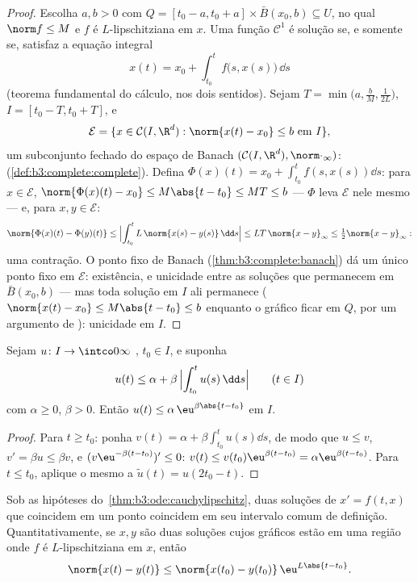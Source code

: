 \begin{proof}
Escolha $a, b > 0$ com $Q = [t_0 - a, t_0 + a]\times\bar
B(x_0, b) \subseteq U$, no qual $\norm f \leq M$ e $f$ é $L$-lipschitziana em
$x$. Uma função $\mathcal C^1$ é solução se, e somente se, satisfaz a equação
integral
\[
x(t) = x_0 + \int_{t_0}^{t}f\bigl(s, x(s)\bigr)\,\dd s
\]
(teorema fundamental do cálculo, nos dois sentidos). Sejam $T =
\min\bigl(a, \frac bM, \frac1{2L}\bigr)$, $I = [t_0 - T, t_0
+ T]$, e
\[
\mathcal E = \{x \in \mathcal C(I, \R^d) : \norm{x(t) - x_0}
\leq b\ \text{em } I\},
\]
um subconjunto fechado do espaço de Banach $(\mathcal C(I, \R^d),
\norm\cdot_\infty)$: 
(\cref{def:b3:complete:complete}). Defina $\Phi(x)(t) = x_0 +
\int_{t_0}^tf(s, x(s))\dd s$: para $x \in \mathcal E$, $\norm{\Phi(x)(t) - x_0} \leq M\abs{t - t_0} \leq MT \leq b$ --- $\Phi$ leva $\mathcal E$
nele mesmo --- e, para $x, y \in
\mathcal E$:
\[
\norm{\Phi(x)(t) - \Phi(y)(t)} \leq \Bigl|\int_{t_0}^t
L\,\norm{x(s) - y(s)}\,\dd s\Bigr| \leq LT\,\norm{x -
y}_\infty \leq \tfrac12\norm{x - y}_\infty :
\]
uma contração. O ponto fixo de Banach (\cref{thm:b3:complete:banach}) dá um único ponto
fixo em $\mathcal E$: existência, e unicidade entre as soluções que permanecem
em $\bar B(x_0, b)$ --- mas toda solução em $I$ ali permanece ($\norm{x(t) - x_0} \leq M\abs{t - t_0} \leq b$ enquanto o
gráfico ficar em $Q$, por um argumento de ): unicidade em
$I$.
\end{proof}

\begin{lemma}[Grönwall]\label{lem:b3:ode:gronwall}
Sejam $u \colon I \to \intco0\infty$ , $t_0 \in
I$, e suponha
\[
u(t) \leq \alpha + \beta\,\Bigl|\int_{t_0}^{t}u(s)\,\dd
s\Bigr| \qquad (t \in I)
\]
com $\alpha \geq 0$, $\beta > 0$. Então $u(t) \leq
\alpha\,\eu^{\beta\abs{t - t_0}}$ em $I$.
\end{lemma}

\begin{proof}
Para $t \geq t_0$: ponha $v(t) = \alpha +
\beta\int_{t_0}^tu(s)\dd s$, de modo que $u \leq v$, $v' = \beta u
\leq \beta v$, e $(v\eu^{-\beta(t - t_0)})' \leq 0$: $v(t)
\leq v(t_0)\eu^{\beta(t-t_0)} = \alpha\eu^{\beta(t - t_0)}$. Para $t \leq t_0$,
aplique o mesmo a $\tilde u(t) = u(2t_0 -
t)$.
\end{proof}

\begin{corollary}
\label{cor:b3:ode:uniqueness}
Sob as hipóteses do~\cref{thm:b3:ode:cauchylipschitz}, duas soluções de $x' = f(t,x)$ que coincidem
em um ponto coincidem em seu intervalo comum de definição.
Quantitativamente, se $x, y$ são duas soluções cujos gráficos estão em
uma região onde $f$ é $L$-lipschitziana em $x$, então
\[
\norm{x(t) - y(t)} \leq \norm{x(t_0) -
y(t_0)}\,\eu^{L\abs{t - t_0}} .
\]
\end{corollary}

